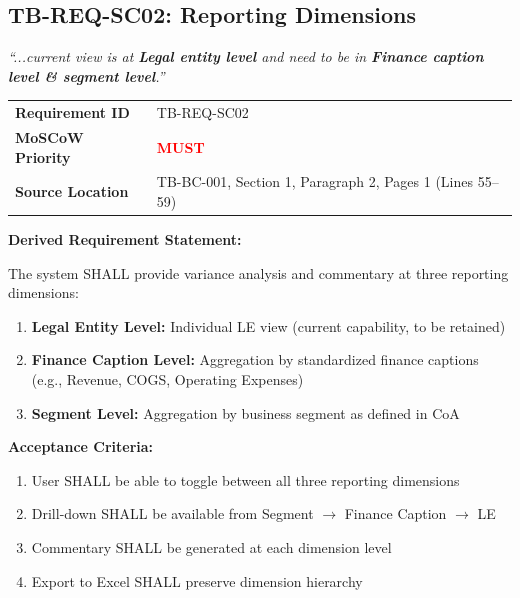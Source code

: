 \subsection{TB-REQ-SC02: Reporting Dimensions}
\label{req:tb-req-sc02}

\begin{tcolorbox}[colback=sourcegreen!5,colframe=sourcegreen!70,title=Source Quotation]
\textit{``...current view is at \textbf{Legal entity level} and need to be in 
\textbf{Finance caption level \& segment level}.''}
\end{tcolorbox}

\begin{tabularx}{\textwidth}{@{}lX@{}}
\toprule
\textbf{Requirement ID} & TB-REQ-SC02 \\
\textbf{MoSCoW Priority} & \textcolor{red}{\textbf{MUST}} \\
\textbf{Source Location} & TB-BC-001, Section 1, Paragraph 2, Pages 1 (Lines 55--59) \\
\bottomrule
\end{tabularx}

\vspace{0.5em}
\textbf{Derived Requirement Statement:}

The system SHALL provide variance analysis and commentary at three reporting dimensions:

\begin{enumerate}[label=(\alph*)]
    \item \textbf{Legal Entity Level:} Individual LE view (current capability, to be retained)
    \item \textbf{Finance Caption Level:} Aggregation by standardized finance captions 
          (e.g., Revenue, COGS, Operating Expenses)
    \item \textbf{Segment Level:} Aggregation by business segment as defined in CoA
\end{enumerate}

\textbf{Acceptance Criteria:}
\begin{enumerate}[label=AC-SC02-\arabic*:,leftmargin=*]
    \item User SHALL be able to toggle between all three reporting dimensions
    \item Drill-down SHALL be available from Segment $\rightarrow$ Finance Caption $\rightarrow$ LE
    \item Commentary SHALL be generated at each dimension level
    \item Export to Excel SHALL preserve dimension hierarchy
\end{enumerate}

